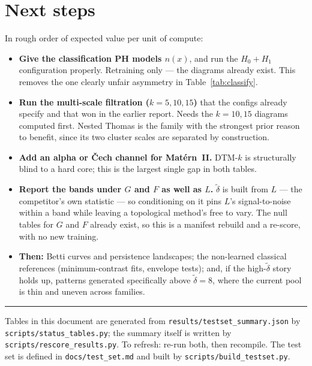 \documentclass[10pt,a4paper]{article}
\newcommand{\dtil}{\tilde\delta}
\begin{document}
\section{Next steps}

In rough order of expected value per unit of compute:

\begin{itemize}
  \item \textbf{Give the classification PH models $n(x)$}, and run the $H_0{+}H_1$ configuration properly. Retraining only --- the diagrams already exist. This removes the one clearly unfair asymmetry in Table~\ref{tab:classify}.
  \item \textbf{Run the multi-scale filtration ($k=5,10,15$)} that the configs already specify and that won in the earlier report. Needs the $k=10,15$ diagrams computed first. Nested Thomas is the family with the strongest prior reason to benefit, since its two cluster scales are separated by construction.
  \item \textbf{Add an alpha or \v{C}ech channel for Mat\'ern~II.} DTM-$k$ is structurally blind to a hard core; this is the largest single gap in both tables.
  \item \textbf{Report the bands under $G$ and $F$ as well as $L$.} $\dtil$ is built from $L$ --- the competitor's own statistic --- so conditioning on it pins $L$'s signal-to-noise within a band while leaving a topological method's free to vary. The null tables for $G$ and $F$ already exist, so this is a manifest rebuild and a re-score, with no new training.
  \item \textbf{Then:} Betti curves and persistence landscapes; the non-learned classical references (minimum-contrast fits, envelope tests); and, if the high-$\dtil$ story holds up, patterns generated specifically above $\dtil = 8$, where the current pool is thin and uneven across families.
\end{itemize}

\vspace{1em}
\hrule
\vspace{0.5em}
{\small Tables in this document are generated from \texttt{results/testset\_summary.json} by \texttt{scripts/status\_tables.py}; the summary itself is written by \texttt{scripts/rescore\_results.py}. To refresh: re-run both, then recompile. The test set is defined in \texttt{docs/test\_set.md} and built by \texttt{scripts/build\_testset.py}.}
\end{document}
